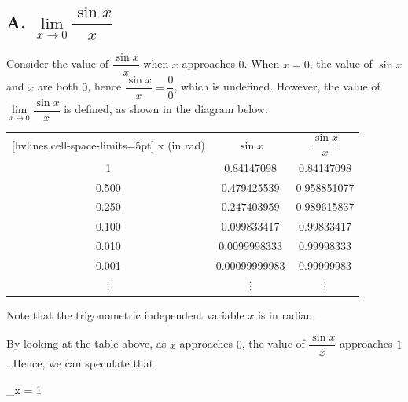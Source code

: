 \documentclass[12pt]{report}
\begin{document}
\subsection*{A. $\lim\limits_{x \to 0} \dfrac{\sin x}{x}$}

Consider the value of $\dfrac{\sin x}{x}$ when $x$ approaches $0$. When $x =
  0$, the value of $\sin x$ and $x$ are both $0$, hence $\dfrac{\sin x}{x} =
  \dfrac{0}{0}$, which is undefined. However, the value of $\lim\limits_{x \to 0}
  \dfrac{\sin x}{x}$ is defined, as shown in the diagram below:
\begin{center}
  \begin{NiceTabular}{|c|c|c|}[hvlines,cell-space-limits=5pt]
    x (in rad) & $\sin x$ & $\dfrac{\sin x}{x}$ \\
    1 & 0.84147098 & 0.84147098 \\
    0.500 & 0.479425539 & 0.958851077 \\
    0.250 & 0.247403959 & 0.989615837 \\
    0.100 & 0.099833417 & 0.99833417 \\
    0.010 & 0.0099998333 & 0.99998333 \\
    0.001 & 0.00099999983 & 0.99999983 \\
    \vdots & \vdots & \vdots \\
  \end{NiceTabular}
\end{center}
Note that the trigonometric independent variable $x$ is in radian.

By looking at the table above, as $x$ approaches $0$, the value of $\dfrac{\sin
    x}{x}$ approaches $1$. Hence, we can speculate that
\begin{mdframed}[style=MyFrame]
  \begin{cequation}
    \lim\limits_{x }  = 1
  \end{cequation}
\end{mdframed}
\end{document}
